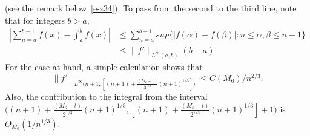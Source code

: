 \documentclass{amsart}
\theoremstyle{definition}
\theoremstyle{remark}
\numberwithin{equation}{section}
\begin{document}
(see the remark below~\eqref{e-z34}).
To pass from the second to the third line, note that 
for integers $b>a$, 
\begin{equation}\label{e-z40}
  \begin{split}
     |\sum_{n=a}^{b-1} f(x) - \int_a^b f(x)| &\le 
\sum_{n=a}^{b-1} sup\{ |f(\alpha)-f(\beta)| : n\le \alpha,\beta\le n+1\}\\ 
     & \le \|f'\|_{L^{\infty}(a,b)}(b-a).
  \end{split}
\end{equation}
For the case at hand, a simple calculation shows that 
$$\|f'\|_{L^\infty\bigl(n+1,[(n+1)+\frac{(M_6-t)}{2^{1/3}}{(n+1)}^{1/3}]\bigr)} 
\le C(M_6)/n^{2/3}.$$
Also, the contribution to the integral from the interval 
$\bigl((n+1)+\frac{(M_6-t)}{2^{1/3}}{(n+1)}^{1/3},
[(n+1)+\frac{(M_6-t)}{2^{1/3}}{(n+1)}^{1/3}]+1\bigr)$ is $O_{M_6}(1/n^{1/3})$.
\end{document}
